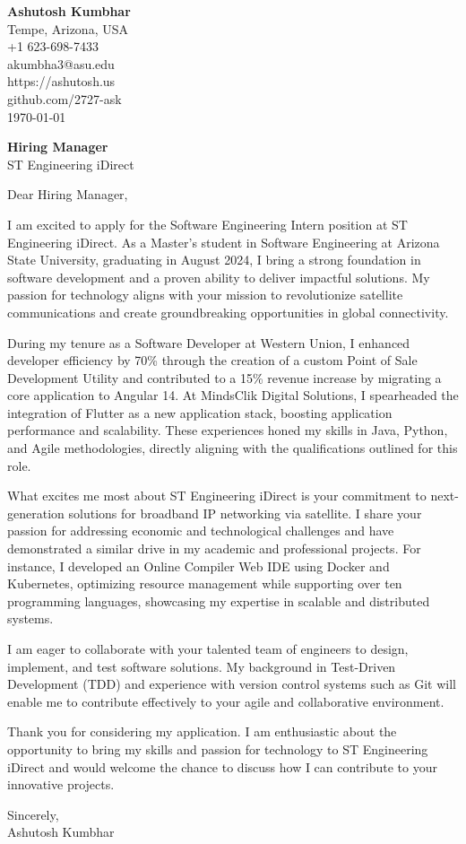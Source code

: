 \documentclass[11pt]{article}
\begin{document}
\begin{flushleft}
\textbf{Ashutosh Kumbhar} \\
Tempe, Arizona, USA \\
+1 623-698-7433 \\
akumbha3@asu.edu \\
https://ashutosh.us \\
github.com/2727-ask \\
\today
\end{flushleft}

\vspace{0.5em}

\textbf{Hiring Manager} \\
ST Engineering iDirect \\

\vspace{1em}

Dear Hiring Manager,

I am excited to apply for the Software Engineering Intern position at ST Engineering iDirect. As a Master’s student in Software Engineering at Arizona State University, graduating in August 2024, I bring a strong foundation in software development and a proven ability to deliver impactful solutions. My passion for technology aligns with your mission to revolutionize satellite communications and create groundbreaking opportunities in global connectivity.

During my tenure as a Software Developer at Western Union, I enhanced developer efficiency by 70\% through the creation of a custom Point of Sale Development Utility and contributed to a 15\% revenue increase by migrating a core application to Angular 14. At MindsClik Digital Solutions, I spearheaded the integration of Flutter as a new application stack, boosting application performance and scalability. These experiences honed my skills in Java, Python, and Agile methodologies, directly aligning with the qualifications outlined for this role.

What excites me most about ST Engineering iDirect is your commitment to next-generation solutions for broadband IP networking via satellite. I share your passion for addressing economic and technological challenges and have demonstrated a similar drive in my academic and professional projects. For instance, I developed an Online Compiler Web IDE using Docker and Kubernetes, optimizing resource management while supporting over ten programming languages, showcasing my expertise in scalable and distributed systems.

I am eager to collaborate with your talented team of engineers to design, implement, and test software solutions. My background in Test-Driven Development (TDD) and experience with version control systems such as Git will enable me to contribute effectively to your agile and collaborative environment.

Thank you for considering my application. I am enthusiastic about the opportunity to bring my skills and passion for technology to ST Engineering iDirect and would welcome the chance to discuss how I can contribute to your innovative projects.

Sincerely, \\
Ashutosh Kumbhar
\end{document}
